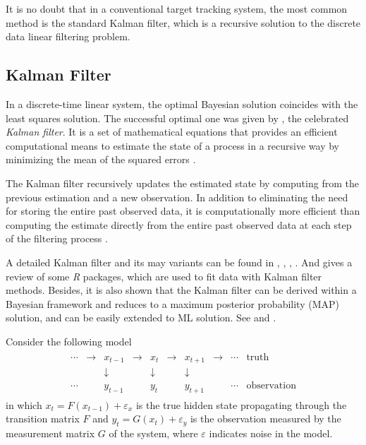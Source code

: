 It is no doubt that in a conventional target tracking system, the most common method is the standard Kalman filter, which is a recursive solution to the discrete data linear filtering problem. 



\subsection*{Kalman Filter}

In a discrete-time linear system, the optimal Bayesian solution coincides with the least squares solution. The successful optimal one was given by \cite{kalman1960new}, the celebrated \textit{Kalman filter}. It is a set of mathematical equations that provides an efficient computational means to estimate the state of a process in a recursive way by minimizing the mean of the squared errors \cite{bishop2001introduction}. 

The Kalman filter recursively updates the estimated state by computing from the previous estimation and a new observation. In addition to eliminating the need for storing the entire past observed data, it is computationally more efficient than computing the estimate directly from the entire past observed data at each step of the filtering process \cite{haykin2001kalman}.  

A detailed Kalman filter and its may variants can be found in \cite{chen2003bayesian}, \cite{rhodes1971tutorial}, \cite{kailath1981lectures}, \cite{sorenson1985kalman}. And  \cite{tusell2011kalman} gives a review of some \textit{R} packages, which are used to fit data with Kalman filter methods. Besides, it is also shown that the Kalman filter can be derived within a Bayesian framework and reduces to a maximum posterior probability (MAP) solution, and can be easily extended to ML solution. See \cite{haykin2001kalman} and \cite{guzzi2016data}. 

Consider the following model 
\begin{align}\label{introKFmodel}
\begin{array}{cccccccccc}\cdots &\to &x_{t-1}&\to &x_{t}&\to &x_{t+1}&\to &\cdots &{\text{truth}}\\ &&\downarrow &&\downarrow &&\downarrow && &\\ \cdots&&y_{t-1}&&y_{t}&&y_{t+1}&&\cdots &{\text{observation}}\end{array}
 \end{align}
in which $x_t=F(x_{t-1})+\varepsilon_x$ is the true hidden state propagating through the transition matrix $F$ and $y_t=G(x_t)+\varepsilon_y$ is the observation measured by the measurement matrix $G$ of the system, where $\varepsilon$ indicates \iid noise in the model. 

